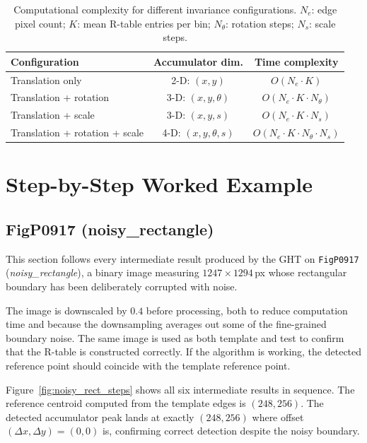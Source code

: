 \documentclass[12pt,a4paper]{article}
\begin{document}
\begin{table}[H]
\centering
\caption{Computational complexity for different invariance configurations.
$N_e$: edge pixel count; $K$: mean R-table entries per bin;
$N_\theta$: rotation steps; $N_s$: scale steps.}
\label{tab:complexity}
\renewcommand{\arraystretch}{1.3}
\begin{tabular}{@{} l c c @{}}
\toprule
\textbf{Configuration} & \textbf{Accumulator dim.} & \textbf{Time complexity} \\
\midrule
Translation only               & 2-D: $(x, y)$             & $O(N_e \cdot K)$ \\
Translation + rotation         & 3-D: $(x, y, \theta)$     & $O(N_e \cdot K \cdot N_\theta)$ \\
Translation + scale            & 3-D: $(x, y, s)$          & $O(N_e \cdot K \cdot N_s)$ \\
Translation + rotation + scale & 4-D: $(x, y, \theta, s)$  & $O(N_e \cdot K \cdot N_\theta \cdot N_s)$ \\
\bottomrule
\end{tabular}
\end{table}

\section{Step-by-Step Worked Example}
\label{sec:worked}

\subsection{FigP0917 (noisy\_rectangle)}

This section follows
every intermediate result produced by the GHT on \texttt{FigP0917}
(\textit{noisy\_rectangle}), a binary image measuring $1247 \times 1294$\,px whose
rectangular boundary has been deliberately corrupted with noise.

The image is downscaled by $0.4$ before processing, both to reduce computation time
and because the downsampling averages out some of the fine-grained boundary noise.
The same image is used as both template and test to confirm that the R-table is constructed correctly.  If the algorithm is working, the
detected reference point should coincide with the template reference point.

Figure~\ref{fig:noisy_rect_steps} shows all six intermediate results in sequence.
The reference centroid computed from the template edges is $(248, 256)$.  The
detected accumulator peak lands at exactly $(248, 256)$ where offset $(\Delta x, \Delta
y) = (0, 0)$ is, confirming correct detection despite the noisy boundary.
\end{document}
